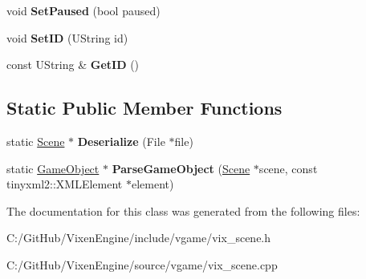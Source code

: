 \begin{DoxyCompactItemize}
\item 
\hypertarget{class_vixen_1_1_scene_a07d63b40e119f30d3c1fa62121eb9e41}{}void {\bfseries Set\+Paused} (bool paused)\label{class_vixen_1_1_scene_a07d63b40e119f30d3c1fa62121eb9e41}

\item 
\hypertarget{class_vixen_1_1_scene_a6b1e72f75144151b77db88a071a457cb}{}void {\bfseries Set\+I\+D} (U\+String id)\label{class_vixen_1_1_scene_a6b1e72f75144151b77db88a071a457cb}

\item 
\hypertarget{class_vixen_1_1_scene_a990292509c393f353b06611ead8a539e}{}const U\+String \& {\bfseries Get\+I\+D} ()\label{class_vixen_1_1_scene_a990292509c393f353b06611ead8a539e}

\end{DoxyCompactItemize}
\subsection*{Static Public Member Functions}
\begin{DoxyCompactItemize}
\item 
\hypertarget{class_vixen_1_1_scene_aea2c652f92e0db4a58a99bd0d2a1f744}{}static \hyperlink{class_vixen_1_1_scene}{Scene} $\ast$ {\bfseries Deserialize} (File $\ast$file)\label{class_vixen_1_1_scene_aea2c652f92e0db4a58a99bd0d2a1f744}

\item 
\hypertarget{class_vixen_1_1_scene_a2995f41ae7f5f691979122d610a475c8}{}static \hyperlink{class_vixen_1_1_game_object}{Game\+Object} $\ast$ {\bfseries Parse\+Game\+Object} (\hyperlink{class_vixen_1_1_scene}{Scene} $\ast$scene, const tinyxml2\+::\+X\+M\+L\+Element $\ast$element)\label{class_vixen_1_1_scene_a2995f41ae7f5f691979122d610a475c8}

\end{DoxyCompactItemize}


The documentation for this class was generated from the following files\+:\begin{DoxyCompactItemize}
\item 
C\+:/\+Git\+Hub/\+Vixen\+Engine/include/vgame/vix\+\_\+scene.\+h\item 
C\+:/\+Git\+Hub/\+Vixen\+Engine/source/vgame/vix\+\_\+scene.\+cpp\end{DoxyCompactItemize}
